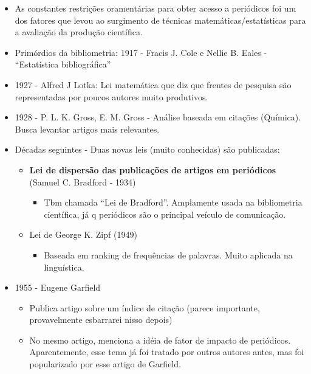 \documentclass[11pt]{article}
\begin{document}
\begin{itemize}
\item As constantes restrições oramentárias para obter acesso a periódicos foi um dos fatores que levou ao surgimento de técnicas matemáticas/estatísticas para a avaliação da produção científica.

\item Primórdios da bibliometria: 1917 - Fracis J. Cole e Nellie B. Eales - ``Estatística bibliográfica''

\item 1927 - Alfred J Lotka: Lei matemática que diz que frentes de pesquisa são representadas por poucos autores muito produtivos.

\item 1928 - P. L. K. Gross, E. M. Gross - Análise baseada em citações (Química). Busca levantar artigos mais relevantes.

\item Décadas seguintes - Duas novas leis (muito conhecidas) são publicadas:

\begin{itemize}
\item \textbf{Lei de dispersão das publicações de artigos em periódicos} (Samuel C. Bradford - 1934)

\begin{itemize}
\item Tbm chamada ``Lei de Bradford''. Amplamente usada na bibliometria científica, já q periódicos são o principal veículo de comunicação.
\end{itemize}

\item Lei de George K. Zipf (1949)

\begin{itemize}
\item Baseada em ranking de frequências de palavras. Muito aplicada na linguística.
\end{itemize}
\end{itemize}

\item 1955 - Eugene Garfield

\begin{itemize}
\item Publica artigo sobre um índice de citação (parece importante, provavelmente esbarrarei nisso depois)

\item No mesmo artigo, menciona a idéia de fator de impacto de periódicos. Aparentemente, esse tema já foi tratado por outros autores antes, mas foi popularizado por esse artigo de Garfield.
\end{itemize}


\end{itemize}
\end{document}
